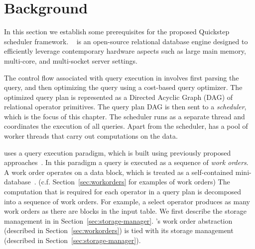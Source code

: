 \section{Background}\label{sec:background}
In this section we establish some prerequisites for the proposed Quickstep scheduler framework.
\sys{}~\cite{quickstep-system} is an open-source relational database engine 
designed to efficiently leverage contemporary hardware aspects such as large main memory, multi-core, and multi-socket server settings. 

The control flow associated with query execution in \sys{} involves first parsing the query, and then optimizing the query using a cost-based query optimizer.
The optimized query plan is represented as a Directed Acyclic Graph (DAG) of relational operator primitives. 
The query plan DAG is then sent to a \textit{scheduler}, which is the focus of this chapter. 
The scheduler runs as a separate thread and coordinates the execution of all queries. 
Apart from the scheduler, \sys{} has a pool of worker threads that carry out computations on the data. 

\sys{} uses a query execution paradigm, which is built using previously proposed approaches~\cite{quickstep-storage,morsel}.
In this paradigm a query is executed as a sequence of \textit{work orders}. 
A work order operates on a data block, which is treated as a self-contained mini-database~\cite{quickstep-storage}.  (c.f. Section~\ref{sec:workorders} for examples of work orders)
The computation that is required for each operator in a query plan is decomposed into a sequence of work orders. 
For example, a select operator produces as many work orders as there are blocks in the input table. 
We first describe the storage management in \sys{} in Section~\ref{sec:storage-manager}.
\sys{}'s work order abstraction (described in Section~\ref{sec:workorders}) is tied with its storage management (described in Section~\ref{sec:storage-manager}).

